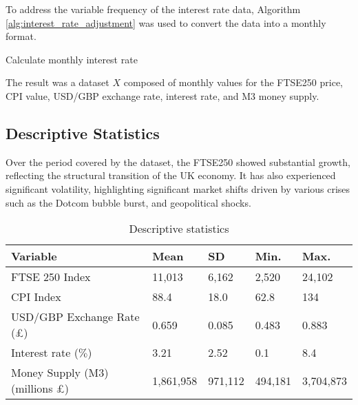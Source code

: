 \documentclass[11pt,a4paper]{article}
\begin{document}
To address the variable frequency of the interest rate data, Algorithm \ref{alg:interest_rate_adjustment}
was used to convert the data into a monthly format.


\begin{algorithm}[H]
    \caption{Calculate monthly interest rate}
    \label{alg:interest_rate_adjustment}
    
\end{algorithm}

The result was a dataset $X$ composed of monthly values for the FTSE250
price, CPI value, USD/GBP exchange rate, interest rate, and M3 money supply. 

\subsection{Descriptive Statistics}

Over the period covered by the dataset, the FTSE250 
showed substantial growth, reflecting the structural transition of the UK economy.
It has also experienced significant volatility, highlighting significant market shifts driven by 
various crises such as the Dotcom bubble burst, and geopolitical shocks.

\begin{table}[h!]
    \centering
    \caption{Descriptive statistics}
    \begin{tabular}{lllll}
        \toprule
        \textbf{Variable} & \textbf{Mean} & \textbf{SD} &  \textbf{Min.} & \textbf{Max.}\\
        \midrule
        FTSE 250 Index &  11,013 & 6,162 & 2,520 & 24,102 \\
        CPI Index &  88.4 & 18.0 & 62.8 & 134 \\
        USD/GBP Exchange Rate (£) &  0.659 & 0.085 & 0.483 & 0.883 \\
        Interest rate ($\%$) &  3.21 & 2.52 & 0.1 & 8.4 \\
        Money Supply (M3) (millions £) &  1,861,958 & 971,112 & 494,181 & 3,704,873 \\
        \bottomrule
    \end{tabular}
\end{table}
\end{document}
